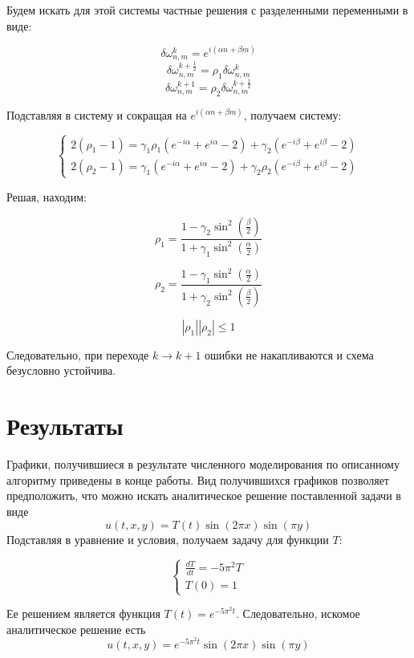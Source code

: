 \documentclass[12pt]{article}
\begin{document}
		Будем искать для этой системы частные решения с разделенными переменными в виде:
		
		$$\delta\omega^k_{n,m} = e^{i(\alpha n + \beta m)}$$
		$$\delta\omega^{k+\frac{1}{2}}_{n,m} = \rho_1 \delta\omega^k_{n,m}$$
		$$\delta\omega^{k+1}_{n,m} = \rho_2\delta\omega^{k+\frac{1}{2}}_{n,m}$$
		
		Подставляя в систему и сокращая на $e^{i(\alpha n + \beta m)}$, получаем систему:
		
		\begin{equation}
			\begin{cases}
				2(\rho_1 -1) = \gamma_1 \rho_1 (e^{-i\alpha} + e^{i\alpha} -2) + \gamma_2 (e^{-i\beta} + e^{i\beta} -2) \\
				2(\rho_2 -1) = \gamma_1 (e^{-i\alpha} + e^{i\alpha} -2) + \gamma_2 \rho_2 (e^{-i\beta} + e^{i\beta} -2)
			\end{cases}
		\end{equation}
		
		Решая, находим:
		
		$$\rho_1 = \frac{1 - \gamma_2 \sin^2 \left( \frac{\beta}{2} \right)}{1 + \gamma_1 \sin^2 \left( \frac{\alpha}{2} \right)}$$
		
		$$\rho_2 = \frac{1 - \gamma_1 \sin^2 \left( \frac{\alpha}{2} \right)}{1 + \gamma_2 \sin^2 \left( \frac{\beta}{2} \right)}$$
		
		$$|\rho_1||\rho_2| \le 1$$
		
		Следовательно, при переходе $k \rightarrow k+1$ ошибки не накапливаются и схема безусловно устойчива.
	\section{Результаты}
		Графики, получившиеся в результате численного моделирования по описанному алгоритму приведены в конце работы.
		Вид получившихся графиков позволяет предположить, что можно искать аналитическое решение поставленной задачи в виде
		$$u(t,x,y) = T(t)\sin(2 \pi x) \sin(\pi y)$$
		Подставляя в уравнение и условия, получаем задачу для функции $T$:
		
		\begin{equation}
			\begin{cases}
				\frac{dT}{dt} = -5 \pi^2 T \\
				T(0) = 1
			\end{cases}
		\end{equation}
		
		Ее решением является функция $T(t) = e^{-5\pi^2t}$. Следовательно, искомое аналитическое решение есть
		$$u(t,x,y) = e^{-5\pi^2 t}\sin(2\pi x) \sin(\pi y)$$
		
\end{document}
